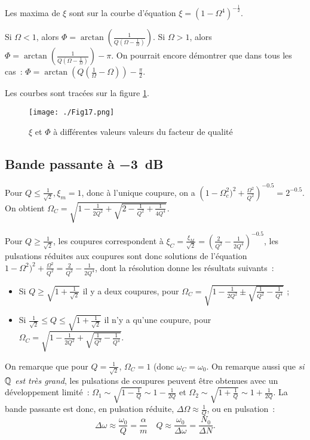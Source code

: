 Les maxima de \(\xi\) sont sur la courbe d'équation \(\xi =
(1-\Omega^4)^{-\frac{1}{2}}\).

Si \(\Omega <1\), alors \(\Phi =
\arctan\left(\frac{1}{Q\left(\Omega-\frac{1}{\Omega}\right)}\right)\). Si
\(\Omega >1\), alors \(\Phi =
\arctan\left(\frac{1}{Q\left(\Omega-\frac{1}{\Omega}\right)}\right) - \pi\). On
pourrait encore démontrer que dans tous les cas~: \(\Phi =
\arctan\left(Q\left(\frac{1}{\Omega}-\Omega\right)\right)-\frac{\pi}{2}\).

Les courbes sont tracées sur la figure \ref{fig:oscforcees}.

\begin{figure}[!h]
  \centering
  \texttt{[image: ./Fig17.png]}
  \caption{\(\xi\) et \(\Phi\) à différentes valeurs valeurs du facteur de
  qualité}
  \label{fig:oscforcees}
\end{figure}

\subsection{Bande passante à \SI{-3}{\deci\bel}}

Pour \(Q \leq \frac{1}{\sqrt{2}}, \xi_m = 1\), donc à l'unique coupure, on a
\(\left(1-\Omega_c^2)^2+\frac{\Omega^2}{Q^2}\right)^{-0.5} = 2^{-0.5}\). On
obtient \(\Omega_C = \sqrt{1 - \frac{1}{2Q^2} + \sqrt{2 - \frac{1}{Q^2} +
\frac{1}{4Q^4}}}\).

Pour \(Q \geqslant \frac{1}{\sqrt{2}}\), les coupures correspondent à \(\xi_C =
\frac{\xi_M}{\sqrt{2}} = \left(\frac{2}{Q^2}-\frac{1}{2Q^4}\right)^{-0.5}\), les
pulsations réduites aux coupures sont donc solutions de l'équation
\(1-\Omega^2)^2 +\frac{\Omega^2}{Q^2} = \frac{2}{Q^2} - \frac{1}{2Q^4}\), dont
la résolution donne les résultats suivants~:
\begin{itemize}
  \item Si \(Q \geqslant \sqrt{1 + \frac{1}{\sqrt{2}}}\) il y a deux coupures,
    pour \(\Omega_C = \sqrt{1-\frac{1}{2Q^2} \pm \sqrt{\frac{1}{Q^2} -
    \frac{1}{Q^4}}}\) ;
  \item Si \(\frac{1}{\sqrt{2}} \leqslant Q \leqslant \sqrt{1 +
    \frac{1}{\sqrt{2}}}\) il n'y a qu'une coupure,
    pour \(\Omega_C = \sqrt{1-\frac{1}{2Q^2} + \sqrt{\frac{1}{Q^2} -
    \frac{1}{Q^4}}}\).
\end{itemize}
On remarque que pour \(Q = \frac{1}{\sqrt{2}}\), \(\Omega_C = 1\) (donc
\(\omega_C = \omega_0\). On remarque aussi que \emph{si \(\mathbb{Q}\) est très grand},
les pulsations de coupures peuvent être obtenues avec un développement limité~:
\(\Omega_1 \sim \sqrt{1-\frac{1}{Q}} \sim 1-\frac{1}{2Q}\) et \(\Omega_2 \sim
\sqrt{1+\frac{1}{Q}} \sim 1+\frac{1}{2Q}\). La bande passante est donc, en
pulsation réduite, \(\Delta\Omega \approx \frac{1}{Q}\), ou en pulsation~:
\begin{equation}
  \Delta\omega \approx \frac{\omega_0}{Q} = \frac{\alpha}{m} \quad Q \approx
  \frac{\omega_0}{\Delta\omega}=\frac{N_0}{\Delta N}.
\end{equation}

